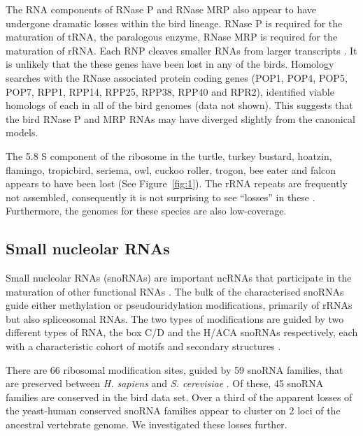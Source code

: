 \documentclass[10pt]{bmc_article}
\newenvironment{bmcformat}{\begin{raggedright}\baselineskip20pt\sloppy\setboolean{publ}{false}}{\end{raggedright}\baselineskip20pt\sloppy}
\begin{document}
\begin{bmcformat}
The RNA components of RNase P and RNase MRP also appear to have
undergone dramatic losses within the bird lineage. RNase P is required
for the maturation of tRNA, the paralogous enzyme, RNase MRP is
required for the maturation of rRNA. Each RNP cleaves smaller RNAs
from larger transcripts \cite{Lopez:2009}. It is unlikely that the
these genes have been lost in any of the birds. Homology searches with
the RNase associated protein coding genes (POP1, POP4, POP5, POP7,
RPP1, RPP14, RPP25, RPP38, RPP40 and RPR2), identified viable homologs
of each in all of the bird genomes \cite{Rosenblad:2006} (data not
shown). This suggests that the bird RNase P and MRP RNAs may have
diverged slightly from the canonical models.

The 5.8 S component of the ribosome in the turtle, turkey bustard,
hoatzin, flamingo, tropicbird, seriema, owl, cuckoo roller, trogon,
bee eater and falcon appears to have been lost (See
Figure~\ref{fig:1}). The rRNA repeats are frequently not assembled,
consequently it is not surprising to see ``losses'' in these \cite{Floutsakou:2013}.
Furthermore, the genomes for these species are also
low-coverage.


\subsection*{Small nucleolar RNAs}

Small nucleolar RNAs (snoRNAs) are important ncRNAs that participate
in the maturation of other functional RNAs \cite{Gardner:2010}. The
bulk of the characterised snoRNAs guide either methylation or
pseudouridylation modifications, primarily of rRNAs but also
spliceosomal RNAs. The two types of modifications are guided by two
different types of RNA, the box C/D and the H/ACA snoRNAs
respectively, each with a characteristic cohort of motifs and
secondary structures \cite{Marz:2011}.

There are 66 ribosomal modification sites, guided by 59 snoRNA
families, that are preserved between \emph{H. sapiens} and
\emph{S. cerevisiae} \cite{Lestrade:2006}. Of these, 45 snoRNA
families are conserved in the bird data set.
Over a third of the apparent losses of the yeast-human conserved
snoRNA families appear to cluster on 2 loci of the ancestral
vertebrate genome. We investigated these losses further.


\end{bmcformat}
\end{document}
